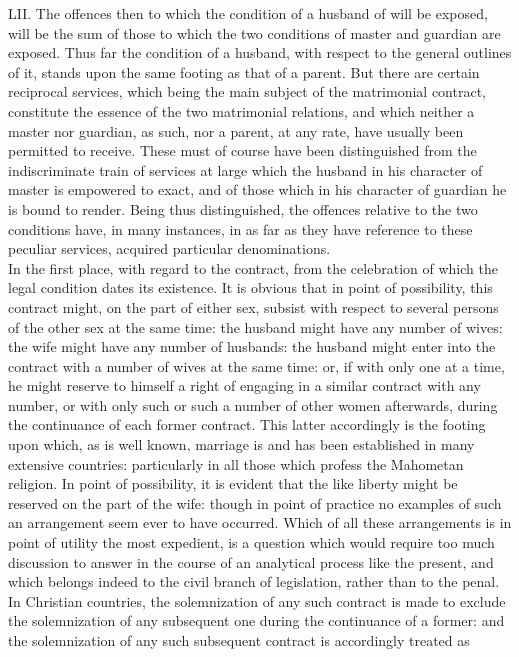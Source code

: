 \documentclass[12pt]{report}
\begin{document}
LII. The offences then to which the condition of a husband of will be
exposed, will be the sum of those to which the two conditions of master
and guardian are exposed. Thus far the condition of a husband, with
respect to the general outlines of it, stands upon the same footing as
that of a parent. But there are certain reciprocal services, which being
the main subject of the matrimonial contract, constitute the essence of
the two matrimonial relations, and which neither a master nor guardian,
as such, nor a parent, at any rate, have usually been permitted to
receive. These must of course have been distinguished from the
indiscriminate train of services at large which the husband in his
character of master is empowered to exact, and of those which in his
character of guardian he is bound to render. Being thus distinguished,
the offences relative to the two conditions have, in many instances, in
as far as they have reference to these peculiar services, acquired
particular denominations.\\
In the first place, with regard to the contract, from the celebration of
which the legal condition dates its existence. It is obvious that in
point of possibility, this contract might, on the part of either sex,
subsist with respect to several persons of the other sex at the same
time: the husband might have any number of wives: the wife might have
any number of husbands: the husband might enter into the contract with a
number of wives at the same time: or, if with only one at a time, he
might reserve to himself a right of engaging in a similar contract with
any number, or with only such or such a number of other women
afterwards, during the continuance of each former contract. This latter
accordingly is the footing upon which, as is well known, marriage is and
has been established in many extensive countries: particularly in all
those which profess the Mahometan religion. In point of possibility, it
is evident that the like liberty might be reserved on the part of the
wife: though in point of practice no examples of such an arrangement
seem ever to have occurred. Which of all these arrangements is in point
of utility the most expedient, is a question which would require too
much discussion to answer in the course of an analytical process like
the present, and which belongs indeed to the civil branch of
legislation, rather than to the penal. In Christian countries, the
solemnization of any such contract is made to exclude the solemnization
of any subsequent one during the continuance of a former: and the
solemnization of any such subsequent contract is accordingly treated as
\end{document}
